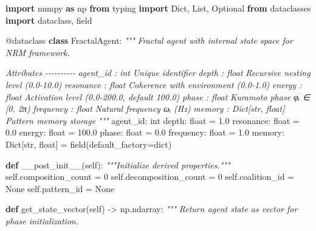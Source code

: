 \documentclass[
]{article}
\newenvironment{Shaded}{}{}
\newcommand{\AttributeTok}[1]{\textcolor[rgb]{0.49,0.56,0.16}{#1}}
\newcommand{\BuiltInTok}[1]{\textcolor[rgb]{0.00,0.50,0.00}{#1}}
\newcommand{\CommentTok}[1]{\textcolor[rgb]{0.38,0.63,0.69}{\textit{#1}}}
\newcommand{\DecValTok}[1]{\textcolor[rgb]{0.25,0.63,0.44}{#1}}
\newcommand{\FloatTok}[1]{\textcolor[rgb]{0.25,0.63,0.44}{#1}}
\newcommand{\ImportTok}[1]{\textcolor[rgb]{0.00,0.50,0.00}{\textbf{#1}}}
\newcommand{\KeywordTok}[1]{\textcolor[rgb]{0.00,0.44,0.13}{\textbf{#1}}}
\newcommand{\NormalTok}[1]{#1}
\newcommand{\OperatorTok}[1]{\textcolor[rgb]{0.40,0.40,0.40}{#1}}
\newcommand{\VariableTok}[1]{\textcolor[rgb]{0.10,0.09,0.49}{#1}}
\begin{document}
\begin{Shaded}
\begin{Highlighting}[]
\ImportTok{import}\NormalTok{ numpy }\ImportTok{as}\NormalTok{ np}
\ImportTok{from}\NormalTok{ typing }\ImportTok{import}\NormalTok{ Dict, List, Optional}
\ImportTok{from}\NormalTok{ dataclasses }\ImportTok{import}\NormalTok{ dataclass, field}

\AttributeTok{@dataclass}
\KeywordTok{class}\NormalTok{ FractalAgent:}
    \CommentTok{"""}
\CommentTok{    Fractal agent with internal state space for NRM framework.}

\CommentTok{    Attributes}
\CommentTok{    {-}{-}{-}{-}{-}{-}{-}{-}{-}{-}}
\CommentTok{    agent\_id : int}
\CommentTok{        Unique identifier}
\CommentTok{    depth : float}
\CommentTok{        Recursive nesting level (0.0{-}10.0)}
\CommentTok{    resonance : float}
\CommentTok{        Coherence with environment (0.0{-}1.0)}
\CommentTok{    energy : float}
\CommentTok{        Activation level (0.0{-}200.0, default 100.0)}
\CommentTok{    phase : float}
\CommentTok{        Kuramoto phase φᵢ ∈ [0, 2π)}
\CommentTok{    frequency : float}
\CommentTok{        Natural frequency ωᵢ (Hz)}
\CommentTok{    memory : Dict[str, float]}
\CommentTok{        Pattern memory storage}
\CommentTok{    """}
\NormalTok{    agent\_id: }\BuiltInTok{int}
\NormalTok{    depth: }\BuiltInTok{float} \OperatorTok{=} \FloatTok{1.0}
\NormalTok{    resonance: }\BuiltInTok{float} \OperatorTok{=} \FloatTok{0.0}
\NormalTok{    energy: }\BuiltInTok{float} \OperatorTok{=} \FloatTok{100.0}
\NormalTok{    phase: }\BuiltInTok{float} \OperatorTok{=} \FloatTok{0.0}
\NormalTok{    frequency: }\BuiltInTok{float} \OperatorTok{=} \FloatTok{1.0}
\NormalTok{    memory: Dict[}\BuiltInTok{str}\NormalTok{, }\BuiltInTok{float}\NormalTok{] }\OperatorTok{=}\NormalTok{ field(default\_factory}\OperatorTok{=}\BuiltInTok{dict}\NormalTok{)}

    \KeywordTok{def}\NormalTok{ \_\_post\_init\_\_(}\VariableTok{self}\NormalTok{):}
        \CommentTok{"""Initialize derived properties."""}
        \VariableTok{self}\NormalTok{.composition\_count }\OperatorTok{=} \DecValTok{0}
        \VariableTok{self}\NormalTok{.decomposition\_count }\OperatorTok{=} \DecValTok{0}
        \VariableTok{self}\NormalTok{.coalition\_id }\OperatorTok{=} \VariableTok{None}
        \VariableTok{self}\NormalTok{.pattern\_id }\OperatorTok{=} \VariableTok{None}

    \KeywordTok{def}\NormalTok{ get\_state\_vector(}\VariableTok{self}\NormalTok{) }\OperatorTok{{-}\textgreater{}}\NormalTok{ np.ndarray:}
        \CommentTok{"""}
\CommentTok{        Return agent state as vector for phase initialization.}


\end{Highlighting}
\end{Shaded}
\end{document}
